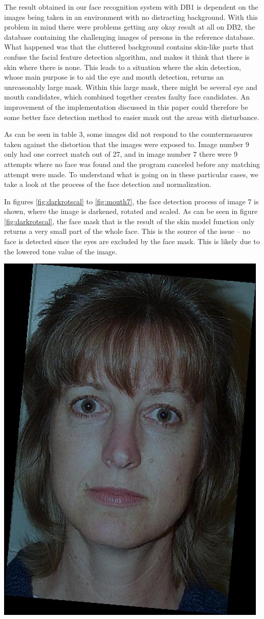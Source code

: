 The result obtained in our face recognition system with DB1 is dependent on the images being taken in an environment with no distracting background. With this problem in mind there were problems getting any okay result at all on DB2, the database containing the challenging images of persons in the reference database. What happened was that the cluttered background contains skin-like parts that confuse the facial feature detection algorithm, and makes it think that there is skin where there is none. This leads to a situation where the skin detection, whose main purpose is to aid the eye and mouth detection, returns an unreasonably large mask. Within this large mask, there might be several eye and mouth candidates, which combined together creates faulty face candidates. An improvement of the implementation discussed in this paper could therefore be some better face detection method to easier mask out the areas with disturbance.

As can be seen in table 3, some images did not respond to the countermeasures taken against the distortion that the images were exposed to. Image number 9 only had one correct match out of 27, and in image number 7 there were 9 attempts where no face was found and the program canceled before any matching attempt were made. To understand what is going on in these particular cases, we take a look at the process of the face detection and normalization.

In figures \ref{fig:darkrotscal} to \ref{fig:mouth7}, the face detection process of image 7 is shown, where the image is darkened, rotated and scaled. As can be seen in figure \ref{fig:darkrotscal}, the face mask that is the result of the skin model function only returns a very small part of the whole face. This is the source of the issue – no face is detected since the eyes are excluded by the face mask. This is likely due to the lowered tone value of the image. 

\begin{Figure}
  \centering
    \includegraphics[width=0.5\columnwidth]{im7_img.jpg}
\end{Figure}

